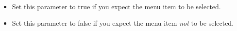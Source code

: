 \begin{itemize}
\item Set this parameter to true if you expect the menu item to be selected. 
\item  Set this parameter to false if you expect the menu item \emph{not} to be selected.
\end{itemize}

    